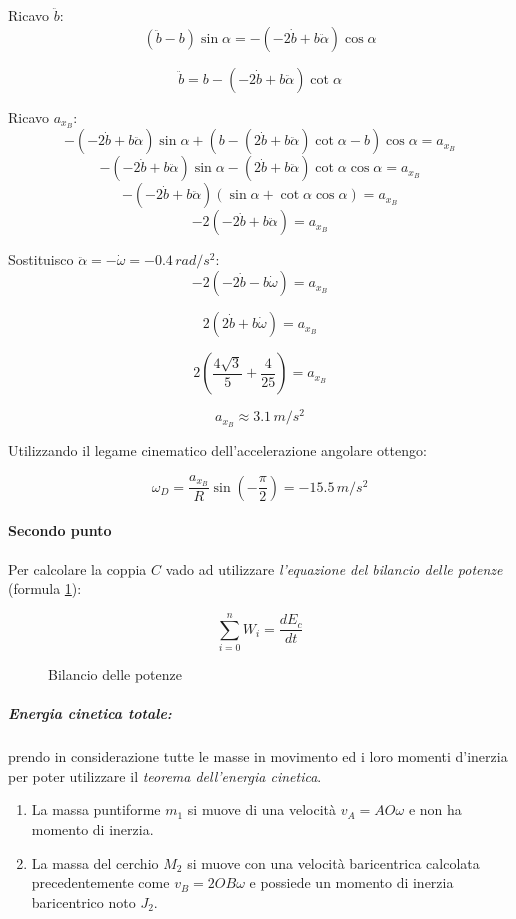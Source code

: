 \documentclass[main.tex]{subfiles}
\begin{document}
Ricavo $\ddot{b}$:
\[
	(\ddot{b}- b)\sin\alpha = - (-2\dot{b} + b\ddot{\alpha})\cos\alpha
\]

\[
	\ddot{b} = b - (-2\dot{b} + b\ddot{\alpha})\cot\alpha
\]

Ricavo $a_{x_B}$:
\[
	-(-2\dot{b} + b\ddot{\alpha})\sin\alpha + (b - (2\dot{b} + b\ddot{\alpha})\cot\alpha - b)\cos\alpha = a_{x_B}
\]
\[
	-(-2\dot{b} + b\ddot{\alpha})\sin\alpha - (2\dot{b} + b\ddot{\alpha})\cot\alpha\cos\alpha = a_{x_B}
\]
\[
	-(-2\dot{b} + b\ddot{\alpha})(\sin\alpha +\cot\alpha\cos\alpha) = a_{x_B}
\]
\[
	-2(-2\dot{b} + b\ddot{\alpha}) = a_{x_B}
\]

Sostituisco $\ddot{\alpha}=-\dot{\omega} = -0.4\,rad/s^2$:
\[
	-2(-2\dot{b} - b\dot{\omega}) = a_{x_B}
\]

\[
	2(2\dot{b} + b\dot{\omega}) = a_{x_B}
\]

\[
	2(\frac{4\sqrt{3}}{5} + \frac{4}{25}) = a_{x_B}
\]

\[
	a_{x_B} \approx 3.1\,m/s^2
\]

Utilizzando il legame cinematico dell'accelerazione angolare ottengo:

\[
	\omega_D = \frac{a_{x_B} }{R}\sin(-\frac{\pi}{2}) = -15.5\,m/s^2
\]

\paragraph{Secondo punto}

Per calcolare la coppia $C$ vado ad utilizzare \textit{l'equazione del bilancio delle potenze} (formula \ref{bilancio_potenze_2207}):

\begin{figure}[H]
	\[
		\sum_{i=0}^n W_i = \frac{dE_c}{dt}
	\]
	\caption{Bilancio delle potenze}
	\label{bilancio_potenze_2207}
\end{figure}

\subparagraph{Energia cinetica totale:} prendo in considerazione tutte le masse in movimento ed i loro momenti d'inerzia per poter utilizzare il \textit{teorema dell'energia cinetica}.

\begin{enumerate}
	\item La massa puntiforme $m_1$ si muove di una velocità $v_A = AO\omega$ e non ha momento di inerzia.
	\item La massa del cerchio $M_2$ si muove con una velocità baricentrica calcolata precedentemente come $v_B = 2OB\omega$ e possiede un momento di inerzia baricentrico noto $J_2$.
\end{enumerate}
\end{document}
